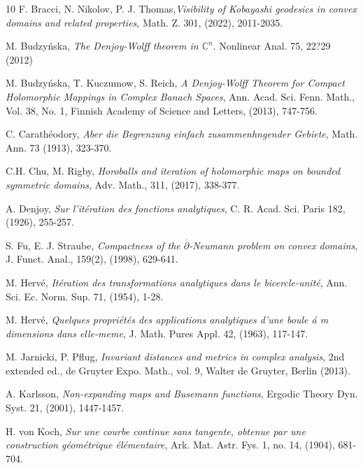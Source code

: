 \documentclass[12pt]{amsart}
\theoremstyle{definition}
\theoremstyle{remark}
\numberwithin{equation}{section}
\def\C{\mathbb C}
\def\ov{\overline}
\begin{document}
\begin{thebibliography}{10}
 {\sc F. Bracci, N. Nikolov, P. J. Thomas},{\it Visibility of Kobayashi geodesics in convex domains and related properties}, Math. Z. 301, (2022), 2011-2035.

 {\sc M. Budzy\'nska}, {\it The Denjoy-Wolff theorem in $\C^n$}. Nonlinear Anal. 75, 22?29 (2012)

 {\sc M. Budzy\'nska, T. Kuczumow, S. Reich}, {\it A Denjoy-Wolff Theorem for Compact Holomorphic Mappings in Complex Banach Spaces}, Ann. Acad. Sci. Fenn. Math., Vol. 38, No. 1, Finnish Academy of Science and Letters, (2013), 747-756.

 {\sc C. Carath\'eodory}, {\it Aber die Begrenzung einfach zusammenhngender Gebiete}, Math. Ann. 73 (1913), 323-370.

 {\sc C.H. Chu, M. Rigby}, {\it Horoballs and iteration of holomorphic maps on bounded symmetric domains}, Adv. Math., 311, (2017), 338-377.

 {\sc A. Denjoy}, {\it Sur l'it\'eration des fonctions analytiques}, C. R. Acad. Sci. Paris 182, (1926), 255-257.

 {\sc S. Fu, E. J. Straube}, {\it Compactness of the $\ov\partial$-Neumann problem on convex domains}, J. Funct. Anal., 159(2), (1998), 629-641. 

 {\sc M. Herv\'e}, {\it It\'eration des transformations analytiques dans le bicercle-unit\'e}, Ann. Sci. Ec. Norm. Sup. 71, (1954), 1-28.

 {\sc M. Herv\'e}, {\it Quelques propri\'et\'es des applications analytiques d'une boule \'a m dimensions dans elle-meme}, J. Math. Pures Appl. 42, (1963), 117-147.

 {\sc M. Jarnicki, P. Pflug}, {\it Invariant distances and metrics in complex analysis}, 2nd extended ed., de Gruyter Expo. Math., vol. 9, Walter de Gruyter, Berlin (2013).

 {\sc A. Karlsson}, {\it Non-expanding maps and Busemann functions}, Ergodic Theory Dyn. Syst. 21, (2001), 1447-1457.

 {\sc H. von Koch}, {\it Sur une courbe continue sans tangente, obtenue par une construction g\'eom\'etrique \'el\'ementaire}, Ark. Mat. Astr. Fys. 1, no. 14, (1904), 681-704.



\end{thebibliography}
\end{document}
